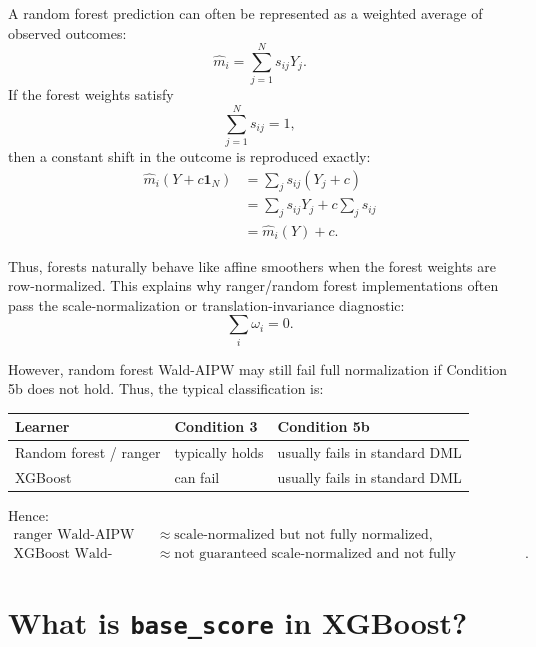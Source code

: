 \documentclass[11pt,a4paper]{article}
\begin{document}
A random forest prediction can often be represented as a weighted average of
observed outcomes:
\begin{equation}
    \hat m_i = \sum_{j=1}^N s_{ij}Y_j.
\end{equation}
If the forest weights satisfy
\begin{equation}
    \sum_{j=1}^N s_{ij}=1,
\end{equation}
then a constant shift in the outcome is reproduced exactly:
\begin{align}
    \hat m_i(Y+c\mathbf{1}_N)
    &=
    \sum_j s_{ij}(Y_j+c) \\
    &=
    \sum_j s_{ij}Y_j
    +
    c\sum_j s_{ij} \\
    &=
    \hat m_i(Y)+c.
\end{align}

Thus, forests naturally behave like affine smoothers when the forest weights are
row-normalized. This explains why ranger/random forest implementations often pass
the scale-normalization or translation-invariance diagnostic:
\begin{equation}
    \sum_i\omega_i=0.
\end{equation}

However, random forest Wald-AIPW may still fail full normalization if Condition
5b does not hold. Thus, the typical classification is:

\begin{center}
\begin{tabular}{lll}
\toprule
Learner & Condition 3 & Condition 5b \\
\midrule
Random forest / ranger & typically holds & usually fails in standard DML \\
XGBoost & can fail & usually fails in standard DML \\
\bottomrule
\end{tabular}
\end{center}

Hence:
\begin{align}
    \text{ranger Wald-AIPW}
    &\approx
    \text{scale-normalized but not fully normalized}, \\
    \text{XGBoost Wald-AIPW}
    &\approx
    \text{not guaranteed scale-normalized and not fully normalized}.
\end{align}

\section{What is \texttt{base\_score} in XGBoost?}
\end{document}

